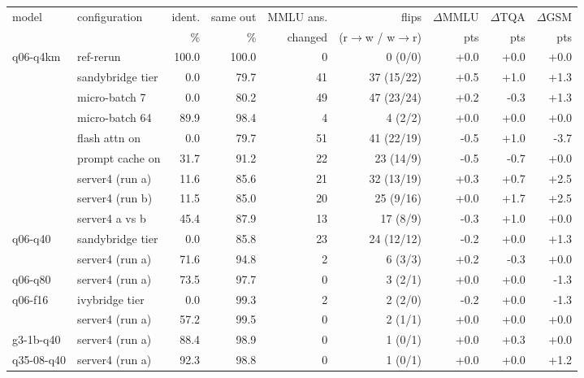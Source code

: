 \begin{tabular}{llrrrrrrr}
\toprule
model & configuration & ident. & same out & MMLU ans. & flips & $\Delta$MMLU & $\Delta$TQA & $\Delta$GSM\\
 & & \% & \% & changed & (r$\to$w / w$\to$r) & pts & pts & pts\\
\midrule
q06-q4km & ref-rerun & 100.0 & 100.0 & 0 & 0 (0/0) & +0.0 & +0.0 & +0.0\\
 & sandybridge tier & 0.0 & 79.7 & 41 & 37 (15/22) & +0.5 & +1.0 & +1.3\\
 & micro-batch 7 & 0.0 & 80.2 & 49 & 47 (23/24) & +0.2 & -0.3 & +1.3\\
 & micro-batch 64 & 89.9 & 98.4 & 4 & 4 (2/2) & +0.0 & +0.0 & +0.0\\
 & flash attn on & 0.0 & 79.7 & 51 & 41 (22/19) & -0.5 & +1.0 & -3.7\\
 & prompt cache on & 31.7 & 91.2 & 22 & 23 (14/9) & -0.5 & -0.7 & +0.0\\
 & server4 (run a) & 11.6 & 85.6 & 21 & 32 (13/19) & +0.3 & +0.7 & +2.5\\
 & server4 (run b) & 11.5 & 85.0 & 20 & 25 (9/16) & +0.0 & +1.7 & +2.5\\
 & server4 a vs b & 45.4 & 87.9 & 13 & 17 (8/9) & -0.3 & +1.0 & +0.0\\
\midrule
q06-q40 & sandybridge tier & 0.0 & 85.8 & 23 & 24 (12/12) & -0.2 & +0.0 & +1.3\\
 & server4 (run a) & 71.6 & 94.8 & 2 & 6 (3/3) & +0.2 & -0.3 & +0.0\\
\midrule
q06-q80 & server4 (run a) & 73.5 & 97.7 & 0 & 3 (2/1) & +0.0 & +0.0 & -1.3\\
\midrule
q06-f16 & ivybridge tier & 0.0 & 99.3 & 2 & 2 (2/0) & -0.2 & +0.0 & -1.3\\
 & server4 (run a) & 57.2 & 99.5 & 0 & 2 (1/1) & +0.0 & +0.0 & +0.0\\
\midrule
g3-1b-q40 & server4 (run a) & 88.4 & 98.9 & 0 & 1 (0/1) & +0.0 & +0.3 & +0.0\\
\midrule
q35-08-q40 & server4 (run a) & 92.3 & 98.8 & 0 & 1 (0/1) & +0.0 & +0.0 & +1.2\\
\bottomrule
\end{tabular}
